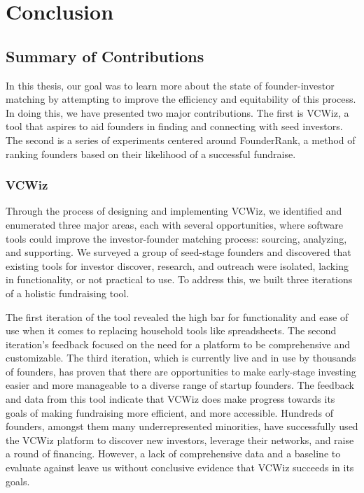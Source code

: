 \chapter{Conclusion}
\label{ch:ch6}

\section{Summary of Contributions}

In this thesis, our goal was to learn more about the state of founder-investor matching by attempting to improve the efficiency and equitability of this process. In doing this, we have presented two major contributions. The first is VCWiz, a tool that aspires to aid founders in finding and connecting with seed investors. The second is a series of experiments centered around FounderRank, a method of ranking founders based on their likelihood of a successful fundraise.

\subsection{VCWiz}

Through the process of designing and implementing VCWiz, we identified and enumerated three major areas, each with several opportunities, where software tools could improve the investor-founder matching process: sourcing, analyzing, and supporting. We surveyed a group of seed-stage founders and discovered that existing tools for investor discover, research, and outreach were isolated, lacking in functionality, or not practical to use. To address this, we built three iterations of a holistic fundraising tool.

The first iteration of the tool revealed the high bar for functionality and ease of use when it comes to replacing household tools like spreadsheets. The second iteration's feedback focused on the need for a platform to be comprehensive and customizable. The third iteration, which is currently live and in use by thousands of founders, has proven that there are opportunities to make early-stage investing easier and more manageable to a diverse range of startup founders. The feedback and data from this tool indicate that VCWiz does make progress towards its goals of making fundraising more efficient, and more accessible. Hundreds of founders, amongst them many underrepresented minorities, have successfully used the VCWiz platform to discover new investors, leverage their networks, and raise a round of financing. However, a lack of comprehensive data and a baseline to evaluate against leave us without conclusive evidence that VCWiz succeeds in its goals.


